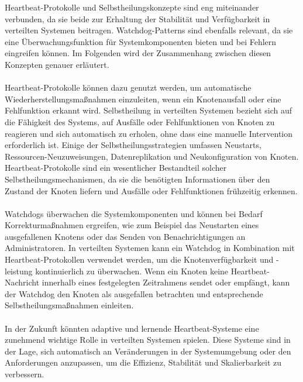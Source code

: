Heartbeat-Protokolle und Selbstheilungskonzepte sind eng miteinander verbunden, da sie beide zur Erhaltung der Stabilität und Verfügbarkeit in verteilten Systemen beitragen. Watchdog-Patterns sind ebenfalls relevant, da sie eine Überwachungsfunktion für Systemkomponenten bieten und bei Fehlern eingreifen können. Im Folgenden wird der Zusammenhang zwischen diesen Konzepten genauer erläutert.
\\\\
Heartbeat-Protokolle können dazu genutzt werden, um automatische Wiederherstellungsmaßnahmen einzuleiten, wenn ein Knotenausfall oder eine Fehlfunktion erkannt wird. Selbstheilung in verteilten Systemen bezieht sich auf die Fähigkeit des Systems, auf Ausfälle oder Fehlfunktionen von Knoten zu reagieren und sich automatisch zu erholen, ohne dass eine manuelle Intervention erforderlich ist. Einige der Selbstheilungsstrategien umfassen Neustarts, Ressourcen-Neuzuweisungen, Datenreplikation und Neukonfiguration von Knoten. Heartbeat-Protokolle sind ein wesentlicher Bestandteil solcher Selbstheilungsmechanismen, da sie die benötigten Informationen über den Zustand der Knoten liefern und Ausfälle oder Fehlfunktionen frühzeitig erkennen.
\\\\
Watchdogs überwachen die Systemkomponenten und können bei Bedarf Korrekturmaßnahmen ergreifen, wie zum Beispiel das Neustarten eines ausgefallenen Knotens oder das Senden von Benachrichtigungen an Administratoren. In verteilten Systemen kann ein Watchdog in Kombination mit Heartbeat-Protokollen verwendet werden, um die Knotenverfügbarkeit und -leistung kontinuierlich zu überwachen. Wenn ein Knoten keine Heartbeat-Nachricht innerhalb eines festgelegten Zeitrahmens sendet oder empfängt, kann der Watchdog den Knoten als ausgefallen betrachten und entsprechende Selbstheilungsmaßnahmen einleiten.
\\\\
In der Zukunft könnten adaptive und lernende Heartbeat-Systeme eine zunehmend wichtige Rolle in verteilten Systemen spielen. Diese Systeme sind in der Lage, sich automatisch an Veränderungen in der Systemumgebung oder den Anforderungen anzupassen, um die Effizienz, Stabilität und Skalierbarkeit zu verbessern.


